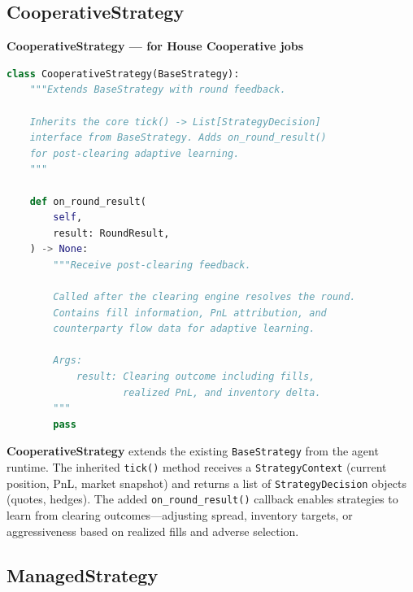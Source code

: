 \documentclass[11pt,a4paper]{article}
\begin{document}
\subsection{CooperativeStrategy}

\begin{contractbox}
\textbf{CooperativeStrategy --- for House Cooperative jobs}
\begin{lstlisting}[language=Python]
class CooperativeStrategy(BaseStrategy):
    """Extends BaseStrategy with round feedback.

    Inherits the core tick() -> List[StrategyDecision]
    interface from BaseStrategy. Adds on_round_result()
    for post-clearing adaptive learning.
    """

    def on_round_result(
        self,
        result: RoundResult,
    ) -> None:
        """Receive post-clearing feedback.

        Called after the clearing engine resolves the round.
        Contains fill information, PnL attribution, and
        counterparty flow data for adaptive learning.

        Args:
            result: Clearing outcome including fills,
                    realized PnL, and inventory delta.
        """
        pass
\end{lstlisting}
\end{contractbox}

\textbf{CooperativeStrategy} extends the existing \texttt{BaseStrategy} from the
agent runtime. The inherited \texttt{tick()} method receives a \texttt{StrategyContext}
(current position, PnL, market snapshot) and returns a list of \texttt{StrategyDecision}
objects (quotes, hedges). The added \texttt{on\_round\_result()} callback enables
strategies to learn from clearing outcomes---adjusting spread, inventory targets,
or aggressiveness based on realized fills and adverse selection.

\subsection{ManagedStrategy}
\end{document}
